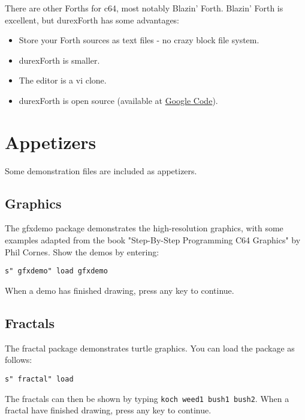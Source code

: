There are other Forths for c64, most notably Blazin' Forth. Blazin' Forth is excellent, but durexForth has some advantages:

\begin{itemize}
\item Store your Forth sources as text files - no crazy block file system.
\item durexForth is smaller.
\item The editor is a vi clone.
\item durexForth is open source (available at \href{http://code.google.com/p/durexforth/}{Google Code}).
\end{itemize}

\section{Appetizers}

Some demonstration files are included as appetizers.

\subsection{Graphics}

The gfxdemo package demonstrates the high-resolution graphics, with some examples adapted from the book "Step-By-Step Programming C64 Graphics" by Phil Cornes. 
Show the demos by entering:

\texttt{s" gfxdemo" load gfxdemo}

When a demo has finished drawing, press any key to continue.

\subsection{Fractals}

The fractal package demonstrates turtle graphics. You can load the package as follows:

\texttt{s" fractal" load}

The fractals can then be shown by typing \texttt{koch weed1 bush1 bush2}. When a fractal have finished drawing, press any key to continue.

